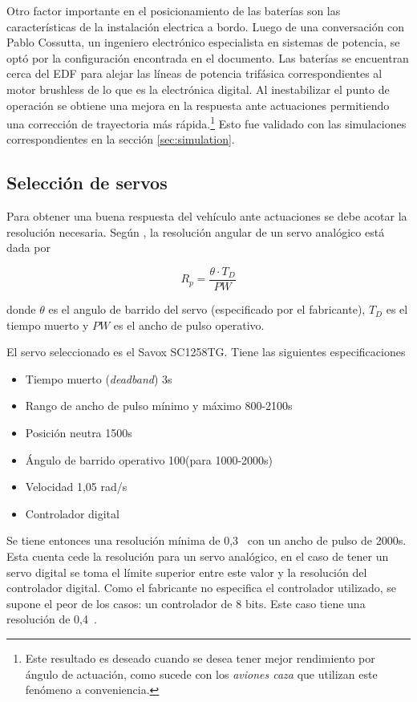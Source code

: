 Otro factor importante en el posicionamiento de las baterías son las características
de la instalación electrica a bordo. Luego de una conversación con Pablo Cossutta, un ingeniero electrónico especialista en sistemas de potencia, se optó por la configuración encontrada en el documento. Las baterías se encuentran cerca del EDF para alejar las líneas de potencia trifásica correspondientes al motor brushless de lo que es la electrónica digital. Al inestabilizar el punto de operación se obtiene una mejora en la respuesta ante actuaciones permitiendo una corrección de trayectoria más rápida.\footnote{Este resultado es deseado cuando se desea tener mejor rendimiento por ángulo de actuación, como sucede con los \textit{aviones caza} que utilizan este fenómeno a conveniencia.} Esto fue validado con las simulaciones correspondientes en la sección \ref{sec:simulation}.





\subsection{Selección de servos} \label{ssec:servoSeleccion}

Para obtener una buena respuesta del vehículo ante actuaciones se debe acotar la resolución necesaria. Según \cite{castillo2018efectos}, la resolución angular de un servo analógico está dada por


\[
R_p = \frac{\theta \cdot T_D}{PW}  
\]

donde $\theta$ es el angulo de barrido del servo (especificado por el fabricante), $T_D$ es el tiempo muerto y $PW$ es el ancho de pulso operativo. 

El servo seleccionado es el Savox SC1258TG. Tiene las siguientes especificaciones

\begin{itemize}
    \item Tiempo muerto (\textit{deadband}) 3\micro s
    \item Rango de ancho de pulso mínimo y máximo 800-2100\micro s
    \item Posición neutra 1500\micro s
    \item Ángulo de barrido operativo 100\grad (para 1000-2000\micro s)
    \item Velocidad 1,05 rad/s
    \item Controlador digital
\end{itemize}

Se tiene entonces una resolución mínima de 0,3\grad~ con un ancho de pulso de 2000\micro s. Esta cuenta cede la resolución para un servo analógico, en el caso de tener un servo digital se toma el límite superior entre este valor y la resolución del controlador digital. Como el fabricante no especifica el controlador utilizado, se supone el peor de los casos: un controlador de 8 bits. Este caso tiene una resolución de 0,4\grad~.

